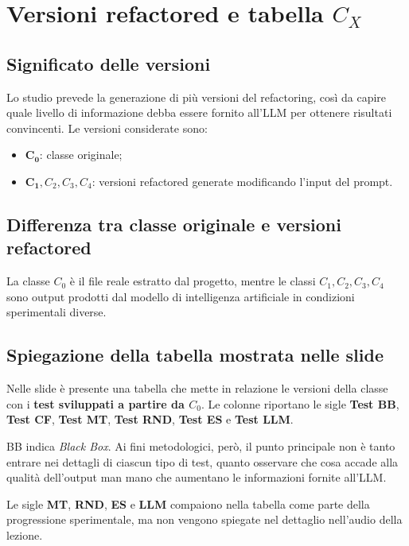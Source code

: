 \section{Versioni refactored e tabella \(C_X\)}
\subsection{Significato delle versioni}

Lo studio prevede la generazione di più versioni del refactoring, così da capire quale livello di informazione debba essere fornito all'LLM per ottenere risultati convincenti. Le versioni considerate sono:

\begin{itemize}
    \item \(\mathbf{C_0}\): classe originale;
    \item \(\mathbf{C_1}, C_2, C_3, C_4\): versioni refactored generate modificando l'input del prompt.
\end{itemize}

\subsection{Differenza tra classe originale e versioni refactored}

La classe \(C_0\) è il file reale estratto dal progetto, mentre le classi \(C_1, C_2, C_3, C_4\) sono output prodotti dal modello di intelligenza artificiale in condizioni sperimentali diverse.

\subsection{Spiegazione della tabella mostrata nelle slide}

Nelle slide è presente una tabella che mette in relazione le versioni della classe con i \textbf{test sviluppati a partire da \(C_0\)}. Le colonne riportano le sigle \textbf{Test BB}, \textbf{Test CF}, \textbf{Test MT}, \textbf{Test RND}, \textbf{Test ES} e \textbf{Test LLM}.

\begin{notaprof}
BB indica \emph{Black Box}. Ai fini metodologici, però, il punto principale non è tanto entrare nei dettagli di ciascun tipo di test, quanto osservare che cosa accade alla qualità dell'output man mano che aumentano le informazioni fornite all'LLM.
\end{notaprof}

\begin{notaslide}
Le sigle \textbf{MT}, \textbf{RND}, \textbf{ES} e \textbf{LLM} compaiono nella tabella come parte della progressione sperimentale, ma non vengono spiegate nel dettaglio nell'audio della lezione.
\end{notaslide}

